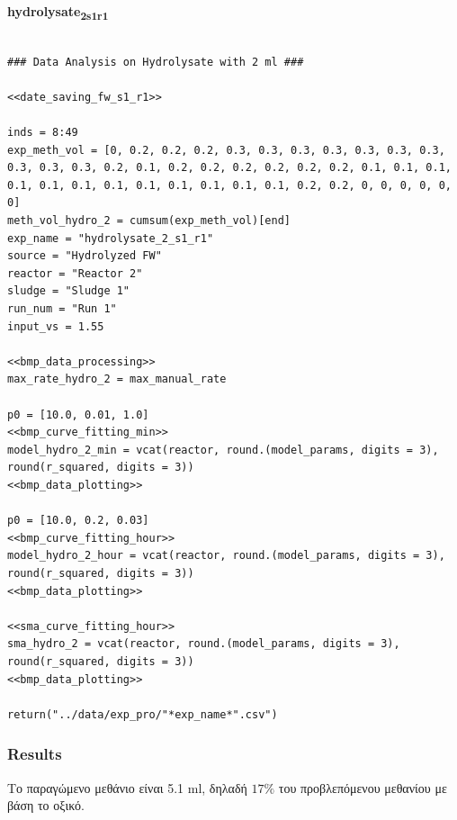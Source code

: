 \documentclass[11pt]{article}
\begin{document}
\textbf{hydrolysate\textsubscript{2}\textsubscript{s1}\textsubscript{r1}}
\begin{verbatim}

### Data Analysis on Hydrolysate with 2 ml ###

<<date_saving_fw_s1_r1>>

inds = 8:49
exp_meth_vol = [0, 0.2, 0.2, 0.2, 0.3, 0.3, 0.3, 0.3, 0.3, 0.3, 0.3, 0.3, 0.3, 0.3, 0.2, 0.1, 0.2, 0.2, 0.2, 0.2, 0.2, 0.2, 0.1, 0.1, 0.1, 0.1, 0.1, 0.1, 0.1, 0.1, 0.1, 0.1, 0.1, 0.1, 0.2, 0.2, 0, 0, 0, 0, 0, 0]
meth_vol_hydro_2 = cumsum(exp_meth_vol)[end]
exp_name = "hydrolysate_2_s1_r1"
source = "Hydrolyzed FW"
reactor = "Reactor 2"
sludge = "Sludge 1"
run_num = "Run 1"
input_vs = 1.55

<<bmp_data_processing>>
max_rate_hydro_2 = max_manual_rate

p0 = [10.0, 0.01, 1.0]
<<bmp_curve_fitting_min>>
model_hydro_2_min = vcat(reactor, round.(model_params, digits = 3), round(r_squared, digits = 3))
<<bmp_data_plotting>>

p0 = [10.0, 0.2, 0.03]
<<bmp_curve_fitting_hour>>
model_hydro_2_hour = vcat(reactor, round.(model_params, digits = 3), round(r_squared, digits = 3))
<<bmp_data_plotting>>

<<sma_curve_fitting_hour>>
sma_hydro_2 = vcat(reactor, round.(model_params, digits = 3), round(r_squared, digits = 3))
<<bmp_data_plotting>>

return("../data/exp_pro/"*exp_name*".csv")
\end{verbatim}

\subsubsection{Results}
\label{sec:org89ca61f}
Το παραγώμενο μεθάνιο είναι 5.1 ml, δηλαδή \(17 \%\) του προβλεπόμενου μεθανίου με βάση το οξικό.
\end{document}
